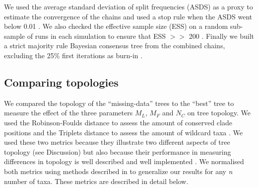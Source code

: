\documentclass[12pt,letterpaper]{article}
\begin{document}
We used the average standard deviation of split frequencies (ASDS) as a proxy to estimate the convergence of the chains and used a stop rule when the ASDS went below 0.01 \citep{Ronquist2012mrbayes}.
We also checked the effective sample size (ESS) on a random sub-sample of runs in each simulation to ensure that ESS $>>$ 200 \citep{drummond2006ess}.
Finally we built a strict majority rule Bayesian consensus tree from the combined chains, excluding the 25\% first iterations as burn-in \citep{Ronquist2012mrbayes}.


\subsection{Comparing topologies}
We compared the topology of the ``missing-data'' trees to the ``best'' tree to measure the effect of the three parameters $M_{L}$, $M_{F}$ and $N_{C}$ on tree topology.
We used the Robinson-Foulds distance \citep{RF1981} to assess the amount of conserved clade positions and the Triplets distance \citep{dobson1975triplets} to assess the amount of wildcard taxa \citep[i.e. taxa that frequently change position in different trees][]{kearneyfragmentary2002}. We used these two metrics because they illustrate two different aspects of tree topology (see Discussion) but also because their performance in measuring differences in topology is well described \citep{Kuhner04112014} and well implemented \citep{Bogdanowicz2012}.
We normalised both metrics using methods described in \citet{Bogdanowicz2012} to generalize our results for any \textit{n} number of taxa.
These metrics are described in detail below.
\end{document}
